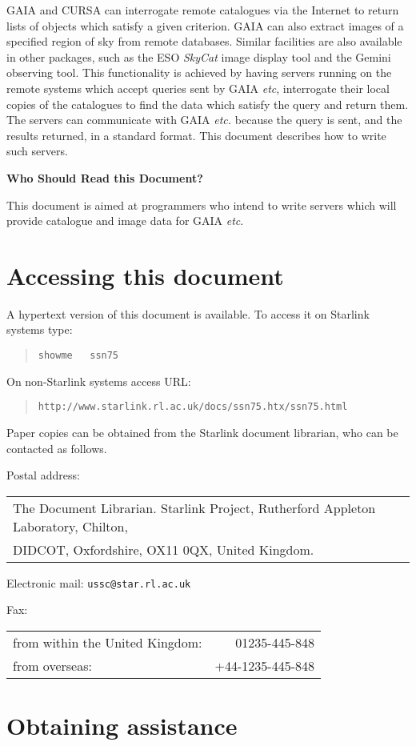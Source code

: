 \documentclass[twoside,11pt]{article}
\newcommand{\stardocabstract}
{GAIA and CURSA can interrogate remote catalogues via the Internet to
return lists of objects which satisfy a given criterion.  GAIA can also
extract images of a specified region of sky from remote databases.
Similar facilities are also available in other packages, such as the
ESO {\it SkyCat}\/ image display tool and the Gemini observing tool.
This functionality is achieved by having servers running on the remote
systems which accept queries sent by GAIA \emph{etc}, interrogate their
local copies of the catalogues to find the data which satisfy the query
and return them.  The servers can communicate with GAIA \emph{etc.} because
the query is sent, and the results returned, in a standard format.  This
document describes how to write such servers.

\begin{latexonly}
\vspace{5mm}
\end{latexonly}

\begin{center}
{\bf Who Should Read this Document?}
\end{center}

This document is aimed at programmers who intend to write servers which
will provide catalogue and image data for GAIA \emph{etc}.}
\newcommand{\htmladdnormallink}[2]{#1}
\newenvironment{latexonly}{}{}
\renewcommand{\_}{\texttt{\symbol{95}}}
\begin{document}
\stardocabstract

\newpage
\section*{Accessing this document}

A hypertext version of this document is available.  To access it on
Starlink systems type:

\begin{quote}
{\tt showme ~ ssn75}
\end{quote}

On non-Starlink systems access URL:

\begin{quote}
\htmladdnormallink{
{\tt http://www.starlink.rl.ac.uk/docs/ssn75.htx/ssn75.html}}
{http://www.starlink.rl.ac.uk/docs/ssn75.htx/ssn75.html}
\end{quote}

Paper copies can be obtained from the Starlink document librarian,
who can be contacted as follows.

Postal address: \\
\begin{tabular}{l}
The Document Librarian. Starlink Project, Rutherford Appleton Laboratory, 
  Chilton, \\
DIDCOT, Oxfordshire, OX11 0QX, United Kingdom.                \\
\end{tabular}


Electronic mail: {\tt ussc@star.rl.ac.uk}


Fax: \\
\begin{tabular}{lr}
from within the United Kingdom: &    01235-445-848 \\
from overseas:                  & +44-1235-445-848 \\
\end{tabular}


\section*{Obtaining assistance}
\end{document}
